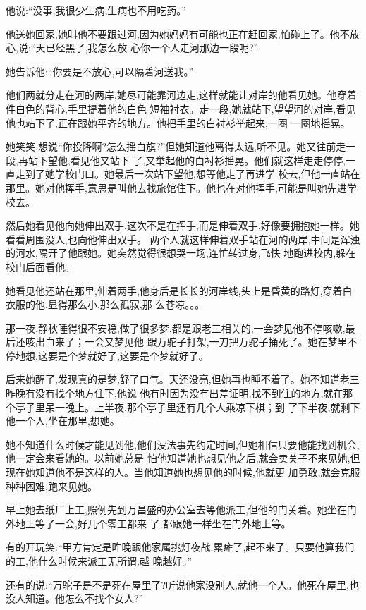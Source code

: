 ﻿\documentclass[12pt]{article}
\begin{document}
他说:``没事,我很少生病,生病也不用吃药。''

他送她回家,她叫他不要跟过河,因为她妈妈有可能也正在赶回家,怕碰上了。他不放心,说:``天已经黑了,我怎么放
心你一个人走河那边一段呢?''

她告诉他:``你要是不放心,可以隔着河送我。''

他们两就分走在河的两岸,她尽可能靠河边走,这样就能让对岸的他看见她。他穿着件白色的背心,手里提着他的白色
短袖衬衣。走一段,她就站下,望望河的对岸,看见他也站下了,正在跟她平齐的地方。他把手里的白衬衫举起来,一圈
一圈地摇晃。

她笑笑,想说``你投降啊?怎么摇白旗?''但她知道他离得太远,听不见。她又往前走一段,再站下望他,看见他又站下
了,又举起他的白衬衫摇晃。他们就这样走走停停,一直走到了她学校门口。她最后一次站下望他,想等他走了再进学
校去,但他一直站在那里。她对他挥手,意思是叫他去找旅馆住下。他也在对他挥手,可能是叫她先进学校去。

然后她看见他向她伸出双手,这次不是在挥手,而是伸着双手,好像要拥抱她一样。她看看周围没人,也向他伸出双手。
两个人就这样伸着双手站在河的两岸,中间是浑浊的河水,隔开了他跟她。她突然觉得很想哭一场,连忙转过身,飞快
地跑进校内,躲在校门后面看他。

她看见他还站在那里,伸着两手,他身后是长长的河岸线,头上是昏黄的路灯,穿着白衣服的他,显得那么小,那么孤寂,那
么苍凉。。。

那一夜,静秋睡得很不安稳,做了很多梦,都是跟老三相关的,一会梦见他不停咳嗽,最后还咳出血来了；一会又梦见他
跟万驼子打架,一刀把万驼子捅死了。她在梦里不停地想,这要是个梦就好了,这要是个梦就好了。

后来她醒了,发现真的是梦,舒了口气。天还没亮,但她再也睡不着了。她不知道老三昨晚有没有找个地方住下,他说
他有时因为没有出差证明,找不到住的地方,就在那个亭子里呆一晚上。上半夜,那个亭子里还有几个人乘凉下棋；到
了下半夜,就剩下他一个人,坐在那里,想她。

她不知道什么时候才能见到他,他们没法事先约定时间,但她相信只要他能找到机会,他一定会来看她的。以前她总是
怕他知道她也想见他之后,就会卖关子不来见她,但现在她知道他不是这样的人。当他知道她也想见他的时候,他就更
加勇敢,就会克服种种困难,跑来见她。

早上她去纸厂上工,照例先到万昌盛的办公室去等他派工,但他的门关着。她坐在门外地上等了一会,好几个零工都来
了,都跟她一样坐在门外地上等。

有的开玩笑:``甲方肯定是昨晚跟他家属挑灯夜战,累瘫了,起不来了。只要他算我们的工,他什么时候来派工无所谓,越
晚越好。''

还有的说:``万驼子是不是死在屋里了?听说他家没别人,就他一个人。他死在屋里,也没人知道。他怎么不找个女人?''
\end{document}
